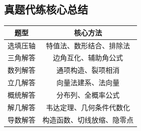 \subsection{真题代练核心总结}

\begin{center}
\begin{tabular}{c|c}
\textbf{题型} & \textbf{核心方法} \\ \hline
选填压轴 & 特值法、数形结合、排除法 \\
三角解答 & 边角互化、辅助角公式 \\
数列解答 & 通项构造、裂项相消 \\
立几解答 & 向量法建系、法向量 \\
概统解答 & 分布列、全概率公式 \\
解几解答 & 韦达定理、几何条件代数化 \\
导数解答 & 构造函数、切线放缩、隐零点
\end{tabular}
\end{center}
